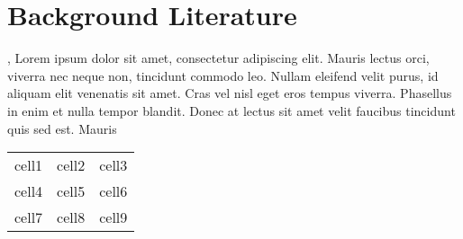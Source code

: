 \chapter{Background Literature}

\cite{book17},
Lorem ipsum dolor sit amet, consectetur adipiscing elit. Mauris lectus orci, viverra nec neque non, tincidunt commodo leo. Nullam eleifend velit purus, id aliquam elit venenatis sit amet. Cras vel nisl eget eros tempus viverra. Phasellus in enim et nulla tempor blandit. Donec at lectus sit amet velit faucibus tincidunt quis sed est. Mauris \cite{greenwade93}

\begin{center}
	\begin{tabular}{ |c|c|c| } 
		\hline
		cell1 & cell2 & cell3 \\ 
		cell4 & cell5 & cell6 \\ 
		cell7 & cell8 & cell9 \\ 
		\hline
	\end{tabular}
\end{center}
